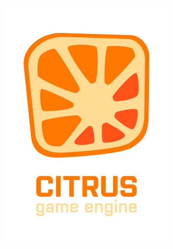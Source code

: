 \documentclass[10pt, unicode]{beamer}
\begin{document}
\begin{frame}
\begin{figure}[H]
\begin{subfigure}{0.49\linewidth}
                \includegraphics[scale=0.2]{Citrus.png}
            \end{subfigure}
        \end{figure}
    \end{frame}
\end{document}
